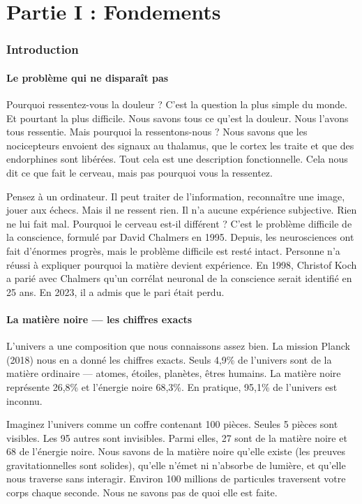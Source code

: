 \documentclass[11pt,a4paper]{article}
\begin{document}
\newpage
\part*{Partie I : Fondements}
\section{Introduction}

\subsection{Le problème qui ne disparaît pas}
Pourquoi ressentez-vous la douleur ? C'est la question la plus simple du monde. Et pourtant la plus difficile. Nous savons tous ce qu'est la douleur. Nous l'avons tous ressentie. Mais pourquoi la ressentons-nous ? Nous savons que les nocicepteurs envoient des signaux au thalamus, que le cortex les traite et que des endorphines sont libérées. Tout cela est une description fonctionnelle. Cela nous dit ce que fait le cerveau, mais pas pourquoi vous la ressentez.

Pensez à un ordinateur. Il peut traiter de l'information, reconnaître une image, jouer aux échecs. Mais il ne ressent rien. Il n'a aucune expérience subjective. Rien ne lui fait mal. Pourquoi le cerveau est-il différent ? C'est le problème difficile de la conscience, formulé par David Chalmers en 1995. Depuis, les neurosciences ont fait d'énormes progrès, mais le problème difficile est resté intact. Personne n'a réussi à expliquer pourquoi la matière devient expérience. En 1998, Christof Koch a parié avec Chalmers qu'un corrélat neuronal de la conscience serait identifié en 25 ans. En 2023, il a admis que le pari était perdu.

\subsection{La matière noire --- les chiffres exacts}
L'univers a une composition que nous connaissons assez bien. La mission Planck (2018) nous en a donné les chiffres exacts. Seuls 4,9\% de l'univers sont de la matière ordinaire --- atomes, étoiles, planètes, êtres humains. La matière noire représente 26,8\% et l'énergie noire 68,3\%. En pratique, 95,1\% de l'univers est inconnu.

Imaginez l'univers comme un coffre contenant 100 pièces. Seules 5 pièces sont visibles. Les 95 autres sont invisibles. Parmi elles, 27 sont de la matière noire et 68 de l'énergie noire. Nous savons de la matière noire qu'elle existe (les preuves gravitationnelles sont solides), qu'elle n'émet ni n'absorbe de lumière, et qu'elle nous traverse sans interagir. Environ 100 millions de particules traversent votre corps chaque seconde. Nous ne savons pas de quoi elle est faite.
\end{document}
